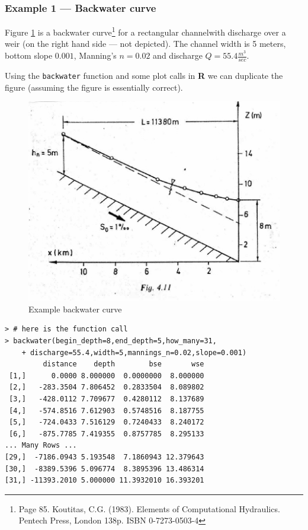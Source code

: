 \subsubsection{Example 1 --- Backwater curve}

Figure \ref{fig:example1} is a backwater curve\footnote{Page 85.  
   Koutitas, C.G. (1983). Elements of Computational Hydraulics. Pentech Press, London 138p. ISBN 0-7273-0503-4 } for a rectangular channelwith discharge over a weir (on the right hand side --- not depicted).  The channel width is 5 meters, bottom slope $0.001$, Manning's $n=0.02$ and discharge $Q=55.4 \frac{m^3}{sec}$.

Using the \texttt{backwater} function and some plot calls in \textbf{R} we can duplicate the figure (assuming the figure is essentially correct).

\begin{figure}[h!] %
   \centering
   \includegraphics[width=5in]{./13-SteadyWSP/bw_curve1.jpg} 
   \caption{Example backwater curve} 
   \label{fig:example1}
\end{figure}
\newpage
\begin{lstlisting}[caption=R Console Output when script is run \\ , label=lst:backwaterConsole]
> # here is the function call
> backwater(begin_depth=8,end_depth=5,how_many=31,
    + discharge=55.4,width=5,mannings_n=0.02,slope=0.001)
         distance    depth        bse       wse
 [1,]      0.0000 8.000000  0.0000000  8.000000
 [2,]   -283.3504 7.806452  0.2833504  8.089802
 [3,]   -428.0112 7.709677  0.4280112  8.137689
 [4,]   -574.8516 7.612903  0.5748516  8.187755
 [5,]   -724.0433 7.516129  0.7240433  8.240172
 [6,]   -875.7785 7.419355  0.8757785  8.295133
... Many Rows ...
[29,]  -7186.0943 5.193548  7.1860943 12.379643
[30,]  -8389.5396 5.096774  8.3895396 13.486314
[31,] -11393.2010 5.000000 11.3932010 16.393201
\end{lstlisting} 

